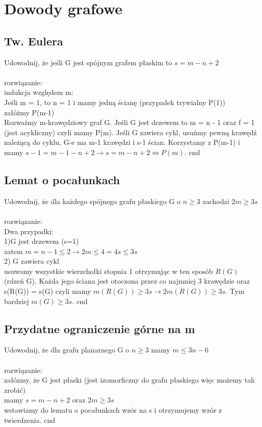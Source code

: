 \documentclass{article}
\begin{document}
\section{Dowody grafowe}

\subsection*{Tw. Eulera}
Udowodnij, że jeśli G jest spójnym grafem płaskim to $s = m - n + 2$\\\\ rozwiązanie: \\
indukcja względem m: \\
Jeśli m = 1, to n = 1 i mamy jedną ścianę (przypadek trywialny P(1)) \\
załóżmy P(m-1) \\
Rozważmy m-krawędziowy graf G.
Jeśli G jest drzewem to m = n - 1 oraz f = 1 (jest acykliczny) czyli mamy P(m).
Jeśli G zawiera cykl, usuńmy pewną krawędź należącą do cyklu,  G-e ma m-1 krawędzi i s-1 ścian.
Korzystamy z P(m-1) i mamy $s-1 = m-1 - n + 2 \rightarrow s = m - n + 2 \iff P(m)$. cnd

\subsection*{Lemat o pocałunkach}
Udowodnij, że dla każdego spójnego grafu płaskiego G o $n \geq 3$ zachodzi $2m \geq 3s$ \\\\rozwiązanie: \\
Dwa przypadki: \\
1)G jest drzewem (s=1)\\
zatem $m = n - 1 \leq 2 \rightarrow 2m \leq 4 = 4s \leq 3s$ \\
2) G zawiera cykl \\
usuwamy wszystkie wierzchołki stopnia 1 otrzymując w ten sposób $R(G)$ (rdzeń G). Każda jego ściana
jest otoczona przez co najmniej 3 krawędzie oraz s(R(G)) = s(G) czyli mamy $m(R(G))\geq 3s \rightarrow 2m(R(G)) \geq 3s$. 
Tym bardziej $m(G) \geq 3s$. cnd 

\subsection*{Przydatne ograniczenie górne na m}
Udowodnij, że dla grafu planarnego G o $n\geq 3$ mamy $m \leq 3n-6$ \\\\ rozwiązanie: \\
załózmy, że G jest płaski (jest izomorficzny do grafu płaskiego więc możemy tak zrobić) \\
mamy $s = m - n + 2$ oraz $2m \geq 3s$ \\
wstawiamy do lematu o pocałunkach wzór na s i otrzymujemy wzór z twierdzenia.  cnd
\end{document}
